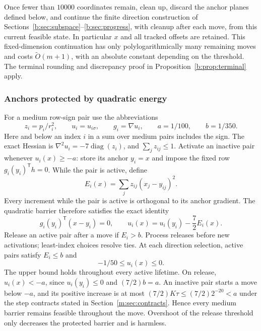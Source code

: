 \documentclass[11pt]{amsart}
\theoremstyle{definition}\newtheorem{definition}[theorem]{Definition}
\theoremstyle{remark}\newtheorem{remark}[theorem]{Remark}
\numberwithin{equation}{section}
\begin{document}
Once fewer than $10000$ coordinates remain, clean up, discard the anchor
planes defined below, and continue the finite direction construction of
Sections~\ref{b:sec:subspace}--\ref{b:sec:progress}, with cleanup after each
move, from this current feasible state. In particular $x$ and all tracked
offsets are retained. This fixed-dimension continuation has only
polylogarithmically many remaining moves and costs
$\widetilde O(m+1)$, with an absolute constant depending on the threshold.
The terminal rounding and discrepancy proof in
Proposition~\ref{b:prop:terminal} apply.

\subsubsection{Anchors protected by quadratic energy}\label{m:subsec:anchors}
For a medium row-sign pair use the abbreviations
\[
 z_i=p_i/r_i^2,\qquad u_i=u_{i\sigma},\qquad
 g_i=\nabla u_i,\qquad a=1/100,\qquad b=1/350.
\]
Here and below an index $i$ in a sum over medium pairs includes the sign.
The exact Hessian is $\nabla^2u_i=-7\operatorname{diag}(z_i)$, and
$\sum_jz_{ij}\le1$.
Activate an inactive pair whenever $u_i(x)\ge-a$: store its anchor
$y_i=x$ and impose the fixed row
$g_i(y_i)^{\mathsf T}h=0$. While the pair is active, define
\[
 E_i(x)=\sum_jz_{ij}(x_j-y_{ij})^2.
\]
Every increment while the pair is active is orthogonal to its anchor
gradient. The quadratic barrier therefore satisfies the exact identity
\begin{equation}
 g_i(y_i)^{\mathsf T}(x-y_i)=0,
 \qquad u_i(x)=u_i(y_i)-\frac72E_i(x).                      \label{m:eq:anchor}
\end{equation}
Release an active pair after a move if $E_i>b$. Process releases before
new activations; least-index choices resolve ties. At each direction
selection, active pairs satisfy $E_i\le b$ and
\begin{equation}
                         -1/50\le u_i(x)\le0.             \label{m:eq:active-barrier}
\end{equation}
The upper bound holds throughout every active lifetime. On release,
$u_i(x)<-a$, since $u_i(y_i)\le0$ and $(7/2)b=a$.
An inactive pair starts a move below $-a$, and its positive increase is
at most $(7/2)K\tau\le(7/2)2^{-20}<a$ under the step contracts stated in
Section~\ref{m:sec:contracts}. Hence every medium barrier remains
feasible throughout the move. Overshoot of the release threshold
only decreases the protected barrier and is harmless.
\end{document}
